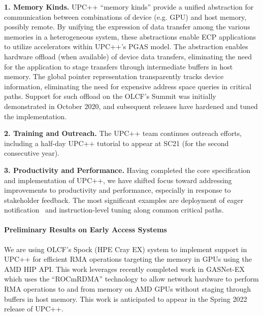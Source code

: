 \textbf{1. Memory Kinds.}
UPC++ ``memory kinds'' provide a unified abstraction for communication between
combinations of device (e.g. GPU) and host memory, possibly remote.  By
unifying the expression of data transfer among the various memories in a
heterogeneous system, these abstractions enable ECP
applications to utilize accelerators within UPC++'s PGAS model.  The
abstraction enables hardware offload (when available) of device data transfers,
eliminating the need for the application to stage transfers through
intermediate buffers in host memory.
The global pointer representation transparently tracks device information,
eliminating the need for expensive address space queries in critical paths.
Support for such offload on the OLCF's
Summit was initially demonstrated in October 2020, and subsequent releases
have hardened and tuned the implementation.

\textbf{2. Training and Outreach.}
The UPC++ team continues outreach efforts, including a half-day UPC++
tutorial to appear at SC21 (for the second consecutive year).

\textbf{3. Productivity and Performance.}
Having completed the core specification and implementation of UPC++, we have
shifted focus toward addressing improvements to productivity and performance,
especially in response to stakeholder feedback.  The most significant
examples are deployment of eager notification~\cite{pawatm21-upcxx-as_eager} 
and instruction-level tuning along common critical paths.

\paragraph{Preliminary Results on Early Access Systems}

We are using OLCF's Spock (HPE Cray EX) system to implement support in UPC++ for efficient RMA
operations targeting the memory in GPUs using the AMD HIP API.  This work
leverages recently completed work in GASNet-EX which uses the ``ROCmRDMA''
technology to allow network hardware to perform RMA operations to and from
memory on AMD GPUs without staging through buffers in host memory.  This work is
anticipated to appear in the Spring 2022 release of UPC++.

